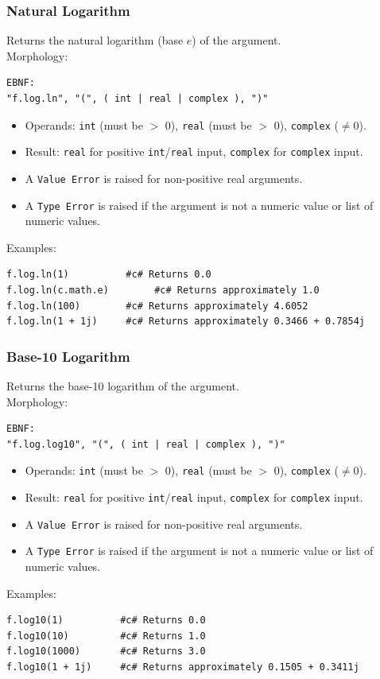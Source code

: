 \subsubsection{Natural Logarithm}
Returns the natural logarithm (base $e$) of the argument. \\
Morphology:
\begin{verbatim}
EBNF:
"f.log.ln", "(", ( int | real | complex ), ")"
\end{verbatim}
\begin{itemize}
\item Operands: \texttt{int} (must be $>$ 0), \texttt{real} (must be $>$ 0), \texttt{complex} ($\neq 0$).
\item Result: \texttt{real} for positive \texttt{int}/\texttt{real} input, \texttt{complex} for \texttt{complex} input.
\item A \texttt{Value Error} is raised for non-positive real arguments.
\item A \texttt{Type Error} is raised if the argument is not a numeric value or list of numeric values.
\end{itemize}
Examples:
\begin{verbatim}
f.log.ln(1)          #c# Returns 0.0
f.log.ln(c.math.e)        #c# Returns approximately 1.0
f.log.ln(100)        #c# Returns approximately 4.6052
f.log.ln(1 + 1j)     #c# Returns approximately 0.3466 + 0.7854j
\end{verbatim}

\subsubsection{Base-10 Logarithm}
Returns the base-10 logarithm of the argument. \\
Morphology:
\begin{verbatim}
EBNF:
"f.log.log10", "(", ( int | real | complex ), ")"
\end{verbatim}
\begin{itemize}
\item Operands: \texttt{int} (must be $>$ 0), \texttt{real} (must be $>$ 0), \texttt{complex} ($\neq 0$).
\item Result: \texttt{real} for positive \texttt{int}/\texttt{real} input, \texttt{complex} for \texttt{complex} input.
\item A \texttt{Value Error} is raised for non-positive real arguments.
\item A \texttt{Type Error} is raised if the argument is not a numeric value or list of numeric values.
\end{itemize}
Examples:
\begin{verbatim}
f.log10(1)          #c# Returns 0.0
f.log10(10)         #c# Returns 1.0
f.log10(1000)       #c# Returns 3.0
f.log10(1 + 1j)     #c# Returns approximately 0.1505 + 0.3411j
\end{verbatim}


